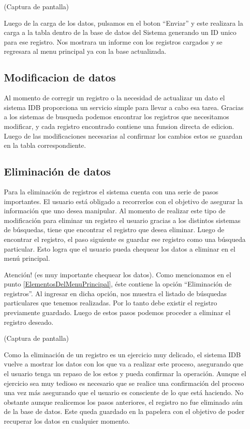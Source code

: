 \documentclass[a4paper,10pt]{article}
\begin{document}
(Captura de pantalla)

Luego de la carga de los datos, pulsamos en el boton “Enviar” y este realizara la carga a la tabla dentro de la base de datos del Sistema generando un ID unico para ese registro. Nos mostrara un informe con los registros cargados y se regresara al menu principal ya con la base actualizada.

\subsection{Modificacion de datos}

Al momento de corregir un registro o la necesidad de actualizar un dato el sistema IDB proporciona un servicio simple para llevar a cabo esa tarea. Gracias a los sistemas de busqueda podemos encontrar los registros que necesitamos modificar, y cada registro encontrado contiene una funsion directa de edicion. Luego de las modificaciones necesarias al confirmar los cambios estos se guardan en la tabla correspondiente.
 
\subsection{Eliminación de datos}

Para la eliminación de registros el sistema cuenta con una serie de pasos importantes. El usuario está obligado a recorrerlos con el objetivo de asegurar la información que uno desea manipular. Al momento de realizar este tipo de modificación para eliminar un registro el usuario gracias a los distintos sistemas de búsquedas, tiene que encontrar el registro que desea eliminar. Luego de encontrar el registro, el paso siguiente es guardar ese registro como una búsqueda particular. Esto logra que el usuario pueda chequear los datos a eliminar en el menú principal. 

Atención! (es muy importante chequear los datos). Como mencionamos en el punto \ref{ElementosDelMenuPrincipal}, éste contiene la opción “Eliminación de registros”. Al ingresar en dicha opción, nos muestra el listado de búsquedas particulares que tenemos realizadas. Por lo tanto debe existir el registro previamente guardado. Luego de estos pasos podemos proceder a eliminar el registro deseado.

(Captura de pantalla)

Como la eliminación de un registro es un ejercicio muy delicado, el sistema IDB vuelve a mostrar los datos con los que va a realizar este proceso, asegurando que el usuario tenga un repaso de los estos y pueda confirmar la operación. Aunque el ejercicio sea muy tedioso es necesario que se realice una confirmación del proceso una vez más asegurando que el usuario es consciente de lo que está haciendo. No obstante aunque realicemos los pasos anteriores, el registro no fue eliminado aún de la base de datos. Este queda guardado en la papelera con el objetivo de poder recuperar los datos en cualquier momento.
\end{document}
